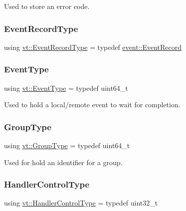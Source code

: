 Used to store an error code. 

\mbox{\label{namespacevt_a2dc2f149222f88a250ec9a13db36865d}} 
\subsubsection{\texorpdfstring{Event\+Record\+Type}{EventRecordType}}
{\footnotesize\ttfamily using \hyperlink{namespacevt_a2dc2f149222f88a250ec9a13db36865d}{vt\+::\+Event\+Record\+Type} = typedef \hyperlink{structvt_1_1event_1_1_event_record}{event\+::\+Event\+Record}}

\mbox{\label{namespacevt_a009267401def7ae8bf201892222d060f}} 
\subsubsection{\texorpdfstring{Event\+Type}{EventType}}
{\footnotesize\ttfamily using \hyperlink{namespacevt_a009267401def7ae8bf201892222d060f}{vt\+::\+Event\+Type} = typedef uint64\+\_\+t}



Used to hold a local/remote event to wait for completion. 

\mbox{\label{namespacevt_a27b5e4411c9b6140c49100e050e2f743}} 
\subsubsection{\texorpdfstring{Group\+Type}{GroupType}}
{\footnotesize\ttfamily using \hyperlink{namespacevt_a27b5e4411c9b6140c49100e050e2f743}{vt\+::\+Group\+Type} = typedef uint64\+\_\+t}



Used for hold an identifier for a group. 

\mbox{\label{namespacevt_adbbef13b92f0a93b14c219b7cc8a48f2}} 
\subsubsection{\texorpdfstring{Handler\+Control\+Type}{HandlerControlType}}
{\footnotesize\ttfamily using \hyperlink{namespacevt_adbbef13b92f0a93b14c219b7cc8a48f2}{vt\+::\+Handler\+Control\+Type} = typedef uint32\+\_\+t}

